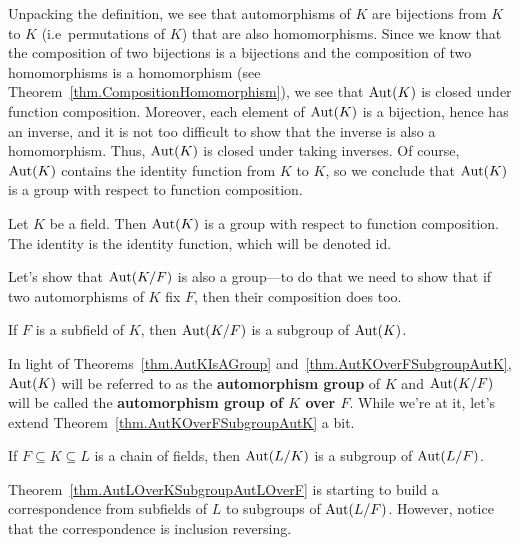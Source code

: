 Unpacking the definition, we see that automorphisms of $K$ are  bijections from $K$ to $K$ (i.e~permutations of $K$) that are also homomorphisms. Since we know that the composition of two bijections is a bijections and the composition of two homomorphisms is a homomorphism (see Theorem~\ref{thm.CompositionHomomorphism}), we see that $\operatorname{Aut}(K)$ is closed under function composition. Moreover, each element of $\operatorname{Aut}(K)$ is a bijection, hence has an inverse, and it is not too difficult to show that the inverse is also a homomorphism. Thus,  $\operatorname{Aut}(K)$ is  closed under taking inverses. Of course, $\operatorname{Aut}(K)$ contains the identity function from $K$ to $K$, so we conclude that $\operatorname{Aut}(K)$ is a group with respect to function composition.

\begin{theorem}\label{thm.AutKIsAGroup}
Let $K$ be a field. Then $\operatorname{Aut}(K)$ is a group with respect to function composition. The identity is the identity function, which will be denoted id.
\end{theorem}

Let's show that $\operatorname{Aut}(K/F)$ is also a group---to do that we  need to show that if two automorphisms of $K$ fix $F$, then their composition does too.

\begin{theorem}\label{thm.AutKOverFSubgroupAutK}
If $F$ is a subfield of $K$, then $\operatorname{Aut}(K/F)$ is a subgroup of $\operatorname{Aut}(K)$.
\end{theorem}

In light of Theorems~\ref{thm.AutKIsAGroup} and~\ref{thm.AutKOverFSubgroupAutK}, $\operatorname{Aut}(K)$ will be referred to as the \textbf{automorphism group} of $K$ and $\operatorname{Aut}(K/F)$ will be called the \textbf{automorphism group of $K$ over $F$}. While we're at it, let's extend Theorem~\ref{thm.AutKOverFSubgroupAutK} a bit.

\begin{theorem}\label{thm.AutLOverKSubgroupAutLOverF}
If $F\subseteq K \subseteq L$ is a chain of fields, then $\operatorname{Aut}(L/K)$ is a subgroup of $\operatorname{Aut}(L/F)$.
\end{theorem}

Theorem~\ref{thm.AutLOverKSubgroupAutLOverF} is starting to build a correspondence from subfields of $L$ to subgroups of $\operatorname{Aut}(L/F)$. However, notice that the correspondence  is inclusion reversing.

\begin{center}
\end{center}

